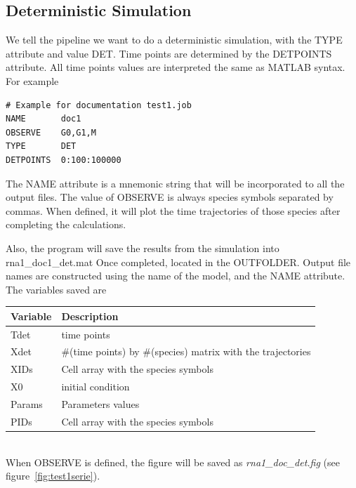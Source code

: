 \documentclass[letterpaper]{article}
\begin{document}
\subsection{Deterministic Simulation}

We tell the pipeline we want to do a deterministic simulation, with
the TYPE attribute and value DET.  Time points are determined by the
DETPOINTS attribute. All time points values are interpreted the same
as MATLAB syntax. For example
{\footnotesize
\begin{verbatim}
# Example for documentation test1.job
NAME       doc1
OBSERVE    G0,G1,M
TYPE       DET
DETPOINTS  0:100:100000
\end{verbatim}
}
The NAME attribute is a mnemonic string that will be incorporated to
all the output files. The value of OBSERVE is always species symbols
separated by commas. When defined, it will plot the time trajectories
of those species after completing the calculations.

Also, the program will save the results from the simulation into
\textsf{rna1\_doc1\_det.mat} Once completed, located in the
OUTFOLDER. Output file names are constructed using the name of the
model, and the NAME attribute. The variables saved are \\
\begin{tabular}{|p{1.5cm}|p{9cm}|} 
  \hline
  Variable & Description \\
  \hline
  Tdet & time points \\
  Xdet & \#(time points) by \#(species) matrix with the trajectories \\
  XIDs & Cell array with the species symbols \\
  X0 & initial condition \\
  Params & Parameters values \\
  PIDs & Cell array with the species symbols\\
  \hline
\end{tabular}\\ 

When OBSERVE is defined, the figure will
be saved as \emph{rna1\_doc\_det.fig} (see
figure~\ref{fig:test1serie}).
\end{document}
